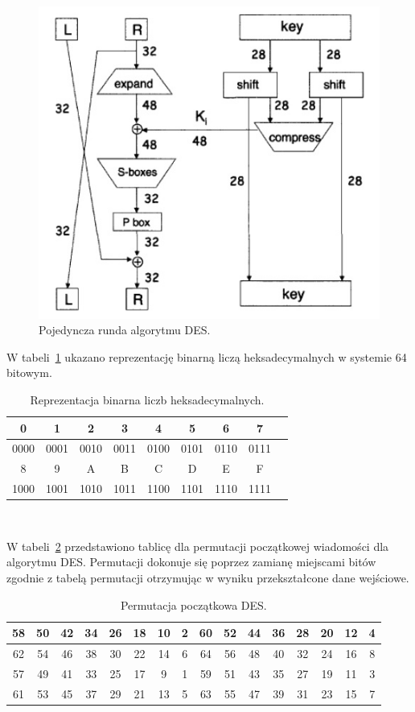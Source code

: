 \documentclass[12p]{article}
\begin{document}
\begin{figure}[H]
\centering
\includegraphics{des}
\caption{Pojedyncza runda algorytmu DES.~\cite{DES}
}\label{des}
\end{figure}

W tabeli~\ref{hex_to_bin} ukazano reprezentację binarną liczą heksadecymalnych w systemie 64 bitowym.

\begin{table}[H]
\centering
\begin{tabular}{|c|c|c|c|c|c|c|c|c|}
\hline
0 & 1 & 2 & 3 & 4 & 5 & 6 & 7\\
\hline
0000 & 0001 & 0010 & 0011 & 0100 & 0101 & 0110 & 0111\\
\hline
8 & 9 & A & B & C & D & E & F\\
\hline
1000 & 1001 & 1010 & 1011 & 1100 & 1101 & 1110 & 1111\\
\hline
\end{tabular}
\caption{Reprezentacja binarna liczb heksadecymalnych.}~\label{hex_to_bin}
\end{table}

W tabeli~\ref{per_poczatkowa} przedstawiono tablicę dla permutacji początkowej wiadomości dla algorytmu DES. Permutacji dokonuje się poprzez zamianę miejscami bitów zgodnie z tabelą permutacji otrzymując w wyniku przekształcone dane wejściowe.

\begin{table}[H]
\centering
\begin{tabular}{|c|c|c|c|c|c|c|c|c|c|c|c|c|c|c|c|}
\hline
58 & 50 & 42 & 34 & 26 & 18 & 10 & 2 & 60 & 52 & 44 & 36 & 28 & 20 & 12 & 4\\
\hline
62 & 54 & 46 & 38 & 30 & 22 & 14 & 6 & 64 & 56 & 48 & 40 & 32 & 24 & 16 & 8\\
\hline
57 & 49 & 41 & 33 & 25 & 17 & 9 & 1 & 59 & 51 & 43 & 35 & 27 & 19 & 11 & 3\\
\hline
61 & 53 & 45 & 37 & 29 & 21 & 13 & 5 & 63 & 55 & 47 & 39 & 31 & 23 & 15 & 7\\
\hline
\end{tabular}
\caption{Permutacja początkowa DES.}\label{per_poczatkowa}
\end{table}
\end{document}
